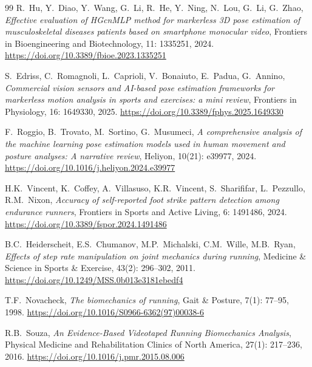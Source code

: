 \begin{thebibliography}{99}
R.\ Hu, Y.\ Diao, Y.\ Wang, G.\ Li, R.\ He, Y.\ Ning, N.\ Lou, G.\ Li, G.\ Zhao,
\textit{Effective evaluation of HGcnMLP method for markerless 3D pose estimation of musculoskeletal diseases patients based on smartphone monocular video},
Frontiers in Bioengineering and Biotechnology, 11: 1335251, 2024.
\url{https://doi.org/10.3389/fbioe.2023.1335251}

S.\ Edriss, C.\ Romagnoli, L.\ Caprioli, V.\ Bonaiuto, E.\ Padua, G.\ Annino,
\textit{Commercial vision sensors and AI-based pose estimation frameworks for markerless motion analysis in sports and exercises: a mini review},
Frontiers in Physiology, 16: 1649330, 2025.
\url{https://doi.org/10.3389/fphys.2025.1649330}

F.\ Roggio, B.\ Trovato, M.\ Sortino, G.\ Musumeci,
\textit{A comprehensive analysis of the machine learning pose estimation models used in human movement and posture analyses: A narrative review},
Heliyon, 10(21): e39977, 2024.
\url{https://doi.org/10.1016/j.heliyon.2024.e39977}

H.K.\ Vincent, K.\ Coffey, A.\ Villasuso, K.R.\ Vincent, S.\ Sharififar, L.\ Pezzullo, R.M.\ Nixon,
\textit{Accuracy of self-reported foot strike pattern detection among endurance runners},
Frontiers in Sports and Active Living, 6: 1491486, 2024.
\url{https://doi.org/10.3389/fspor.2024.1491486}


B.C.\ Heiderscheit, E.S.\ Chumanov, M.P.\ Michalski, C.M.\ Wille, M.B.\ Ryan,
\textit{Effects of step rate manipulation on joint mechanics during running},
Medicine \& Science in Sports \& Exercise, 43(2): 296--302, 2011.
\url{https://doi.org/10.1249/MSS.0b013e3181ebedf4}

T.F.\ Novacheck,
\textit{The biomechanics of running},
Gait \& Posture, 7(1): 77--95, 1998.
\url{https://doi.org/10.1016/S0966-6362(97)00038-6}

R.B.\ Souza,
\textit{An Evidence-Based Videotaped Running Biomechanics Analysis},
Physical Medicine and Rehabilitation Clinics of North America, 27(1): 217--236, 2016.
\url{https://doi.org/10.1016/j.pmr.2015.08.006}


\end{thebibliography}
